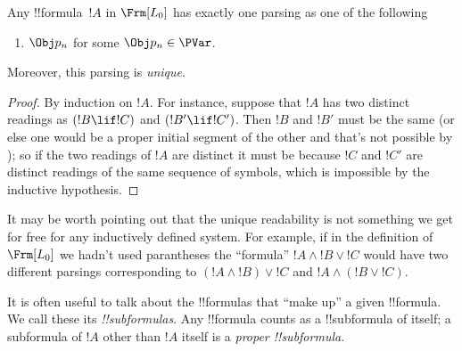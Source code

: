 \documentclass[../../../include/open-logic-section]{subfiles}
\begin{document}
\begin{prop}
Any !!{formula}~$!A$ in $ \Frm[L_0]$ has exactly one parsing as one of
the following
\begin{enumerate}


\item $\Obj p_n$ for some $\Obj p_n \in  \PVar$.
  




\end{enumerate}
Moreover, this parsing is \emph{unique}.
\end{prop}

\begin{proof}
By induction on $!A$. For instance, suppose that $!A$ has two distinct
readings as $(!B \lif !C)$ and $(!B' \lif !C')$. Then $!B$ and $!B'$
must be the same (or else one would be a proper initial segment of the
other and that's not possible by ); 
so if the two readings of $!A$ are distinct it must be because
$!C$ and $!C'$ are distinct readings of the same sequence of symbols,
which is impossible by the inductive hypothesis.
\end{proof}

\begin{explain}
It may be worth pointing out that the unique readability is not something 
we get for free for any inductively defined system. For example, if in the
definition of $\Frm[L_0]$ we hadn't used parantheses the ``formula'' $!A 
\land !B \lor !C$ would have two different parsings corresponding to $(!A 
\land !B) \lor !C$ and $!A \land (!B \lor !C)$.
\end{explain}

\begin{explain}
It is often useful to talk about the !!{formula}s that ``make up'' a
given !!{formula}.  We call these its \emph{!!{subformula}s}.  Any
!!{formula} counts as a !!{subformula} of itself; a subformula of $!A$
other than $!A$ itself is a \emph{proper !!{subformula}}.
\end{explain}
\end{document}
